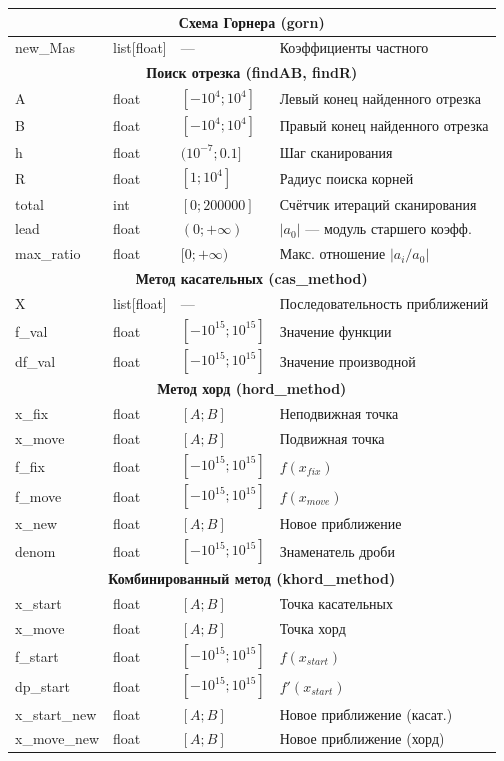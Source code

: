 \documentclass[a4paper,14pt]{extarticle}
\begin{document}
\begin{longtable}{|p{3cm}|p{2.5cm}|p{3cm}|p{5cm}|}
\multicolumn{4}{|c|}{\textbf{Схема Горнера (gorn)}} \\
\hline
new\_Mas & list[float] & --- & Коэффициенты частного \\
\hline

\multicolumn{4}{|c|}{\textbf{Поиск отрезка (findAB, findR)}} \\
\hline
A & float & $[-10^4; 10^4]$ & Левый конец найденного отрезка \\
\hline
B & float & $[-10^4; 10^4]$ & Правый конец найденного отрезка \\
\hline
h & float & $(10^{-7}; 0.1]$ & Шаг сканирования \\
\hline
R & float & $[1; 10^4]$ & Радиус поиска корней \\
\hline
total & int & $[0; 200000]$ & Счётчик итераций сканирования \\
\hline
lead & float & $(0;+\infty)$ & $|a_0|$ --- модуль старшего коэфф. \\
\hline
max\_ratio & float & $[0;+\infty)$ & Макс. отношение $|a_i/a_0|$ \\
\hline

\multicolumn{4}{|c|}{\textbf{Метод касательных (cas\_method)}} \\
\hline
X & list[float] & --- & Последовательность приближений \\
\hline
f\_val & float & $[-10^{15}; 10^{15}]$ & Значение функции \\
\hline
df\_val & float & $[-10^{15}; 10^{15}]$ & Значение производной \\
\hline

\multicolumn{4}{|c|}{\textbf{Метод хорд (hord\_method)}} \\
\hline
x\_fix & float & $[A; B]$ & Неподвижная точка \\
\hline
x\_move & float & $[A; B]$ & Подвижная точка \\
\hline
f\_fix & float & $[-10^{15}; 10^{15}]$ & $f(x_{fix})$ \\
\hline
f\_move & float & $[-10^{15}; 10^{15}]$ & $f(x_{move})$ \\
\hline
x\_new & float & $[A; B]$ & Новое приближение \\
\hline
denom & float & $[-10^{15}; 10^{15}]$ & Знаменатель дроби \\
\hline

\multicolumn{4}{|c|}{\textbf{Комбинированный метод (khord\_method)}} \\
\hline
x\_start & float & $[A; B]$ & Точка касательных \\
\hline
x\_move & float & $[A; B]$ & Точка хорд \\
\hline
f\_start & float & $[-10^{15}; 10^{15}]$ & $f(x_{start})$ \\
\hline
dp\_start & float & $[-10^{15}; 10^{15}]$ & $f'(x_{start})$ \\
\hline
x\_start\_new & float & $[A; B]$ & Новое приближение (касат.) \\
\hline
x\_move\_new & float & $[A; B]$ & Новое приближение (хорд) \\
\hline


\end{longtable}
\end{document}
